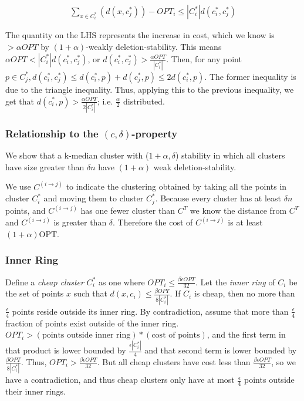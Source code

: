 \documentclass[paper=a4, fontsize=10.5pt]{scrartcl} %
\numberwithin{equation}{section} %
\numberwithin{figure}{section} %
\numberwithin{table}{section} %
\begin{document}
\begin{align}
\sum_{x \in C^*_i} (d(x, c^*_j) )  - OPT_i \leq |C^*_i| d(c^*_i, c^*_j)
\end{align}

The quantity on the LHS represents the increase in cost, which we know is $ > \alpha OPT$ by $(1+\alpha)$-weakly deletion-stability. This means $\alpha OPT < |C^*_i| d(c^*_i, c^*_j)$, or $d(c^*_i, c^*_j) >\frac{\alpha OPT}{|C^*_i|}$.  Then, for any point $p \in C^*_j, d(c^*_i, c^*_j) \leq d(c^*_i, p) + d(c^*_j, p) \leq 2d(c^*_i, p)$. The former inequality is due to the triangle inequality.  Thus, applying this to the previous inequality, we get that $d(c^*_i, p) > \frac{\alpha OPT}{2 |C^*_i|}$; i.e. $\frac{\alpha}{2}$ distributed.

\subsubsection{Relationship to the $(c, \delta)$-property}

We show that a k-median cluster with ($1+\alpha, \delta$) stability in which all clusters have size greater than $\delta n$ have $(1+\alpha)$ weak deletion-stability.

We use $C^{(i\rightarrow j)}$ to indicate the clustering obtained by taking all the points in cluster $C_i^*$ and moving them to cluster $C_j^*$. Because every cluster has at least $\delta n$ points, and $C^{(i \rightarrow j)}$ has one fewer cluster than $C^T$ we know the distance from $C^T$ and $C^{(i\rightarrow j)}$ is greater than $\delta$. Therefore the cost of $C^{(i\rightarrow j)}$ is at least $(1 + \alpha)\text{OPT}$.

\subsubsection{Inner Ring}


Define a \emph{cheap cluster} $C^*_i$ as one where $OPT_i \leq \frac{\beta \epsilon OPT}{32}$.  Let the \emph{inner ring} of $C_i$ be the set of points $x$ such that $d(x, c_i) \leq \frac{ \beta OPT }{8 |C^*_i|}$.  If $C_i$ is cheap, then no more than $\frac{\epsilon}{4}$ points reside outside its inner ring.  By contradiction, assume that more than $\frac{\epsilon}{4}$ fraction of points exist outside of the inner ring.  $OPT_i > (\text{points outside inner ring}) * (\text{cost of points})$, and the first term in that product is lower bounded by $\frac{\epsilon |C^*_i|}{4}$ and that second term is lower bounded by $\frac{\beta OPT}{8 |C^*_i|}$.  Thus, $OPT_i > \frac{\beta \epsilon OPT }{32}$.  But all cheap clusters have cost less than $\frac{\beta \epsilon OPT}{32}$, so we have a contradiction, and thus cheap clusters only have at most $\frac{\epsilon}{4}$ points outside their inner rings.
\end{document}
